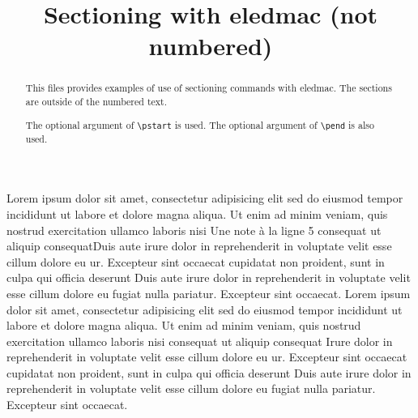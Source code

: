 \documentclass{article}
\begin{document}
\begin{english}
\date{}
\title{Sectioning with eledmac (not numbered)}
\maketitle
\begin{abstract}
This files provides examples of use of sectioning commands with eledmac.
The sections are outside of the numbered text. 

The optional argument of \verb+\pstart+ is used. The optional argument of \verb+\pend+ is also used.
\end{abstract}
\end{english}

\beginnumbering
{}
Lorem ipsum dolor sit amet, consectetur adipisicing elit
sed do eiusmod tempor incididunt ut labore et dolore
magna aliqua. Ut enim ad minim veniam, quis nostrud
exercitation ullamco laboris nisi
Une note à la ligne 5 consequat ut aliquip consequat\pend[\vskip 2ex]
Duis aute irure dolor in reprehenderit
in voluptate velit esse cillum dolore eu ur. Excepteur sint occaecat
cupidatat non proident, sunt in culpa qui officia deserunt
Duis aute irure dolor in reprehenderit
in voluptate velit esse cillum dolore eu fugiat nulla
pariatur. Excepteur sint occaecat.
\pend[]
Lorem ipsum dolor sit amet, consectetur adipisicing elit
sed do eiusmod tempor incididunt ut labore et dolore
magna aliqua. Ut enim ad minim veniam, quis nostrud
exercitation ullamco laboris nisi
 consequat ut aliquip consequat
\pend[\vskip\baselineskip\hspace{0.5\hsize}\hspace{-1em}***]
Irure dolor in reprehenderit
in voluptate velit esse cillum dolore eu ur. Excepteur sint occaecat
cupidatat non proident, sunt in culpa qui officia deserunt
Duis aute irure dolor in reprehenderit
in voluptate velit esse cillum dolore eu fugiat nulla
pariatur. Excepteur sint occaecat.
\pend
\endnumbering
\end{document}
